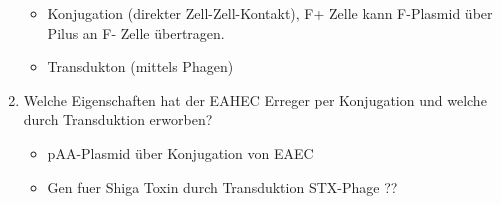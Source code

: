 \begin{enumerate}
\begin{itemize}
						\item Konjugation (direkter Zell-Zell-Kontakt), F+ Zelle kann F-Plasmid \"uber Pilus an F- Zelle \"ubertragen.
						\item Transdukton (mittels Phagen)
				\end{itemize}
			\item Welche Eigenschaften hat der EAHEC Erreger per Konjugation und welche durch Transduktion erworben?
				\begin{itemize}
					\item pAA-Plasmid \"uber Konjugation von EAEC
					\item Gen fuer Shiga Toxin durch Transduktion STX-Phage ??
				\end{itemize}

\end{enumerate}

